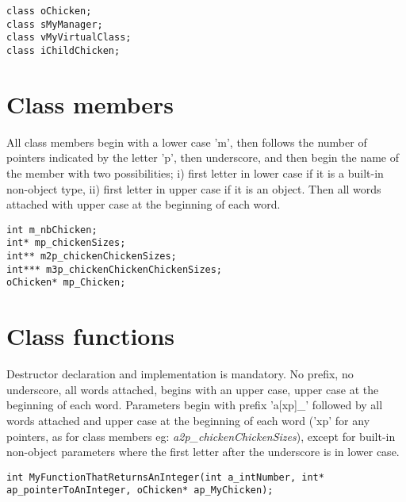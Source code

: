 \documentclass[a4paper, 11pt]{article}
\begin{document}
\begin{lstlisting}[label={class_names},caption=Examples of class names.]
class oChicken;
class sMyManager;
class vMyVirtualClass;
class iChildChicken;
\end{lstlisting}

\section{Class members}

All class members begin with a lower case 'm', then follows the number of pointers indicated by the letter 'p', then underscore, and then begin the name of the member with two possibilities; i) first letter in lower case if it is a built-in non-object type, ii) first letter in upper case if it is an object.
Then all words attached with upper case at the beginning of each word.

\begin{lstlisting}[label={class_members},caption=Examples of class members naming.]
int m_nbChicken;
int* mp_chickenSizes;
int** m2p_chickenChickenSizes;
int*** m3p_chickenChickenChickenSizes;
oChicken* mp_Chicken;
\end{lstlisting}

\section{Class functions}

Destructor declaration and implementation is mandatory.
No prefix, no underscore, all words attached, begins with an upper case, upper case at the beginning of each word. Parameters begin with prefix 'a[xp]\_' followed by all words attached and upper case at the beginning of each word ('xp' for any pointers, as for class members eg: \textit{a2p\_chickenChickenSizes}), except for built-in non-object parameters where the first letter after the underscore is in lower case.

\begin{lstlisting}[label={class_functions},caption=Examples of class functions naming.]
int MyFunctionThatReturnsAnInteger(int a_intNumber, int* ap_pointerToAnInteger, oChicken* ap_MyChicken);
\end{lstlisting}
\end{document}
